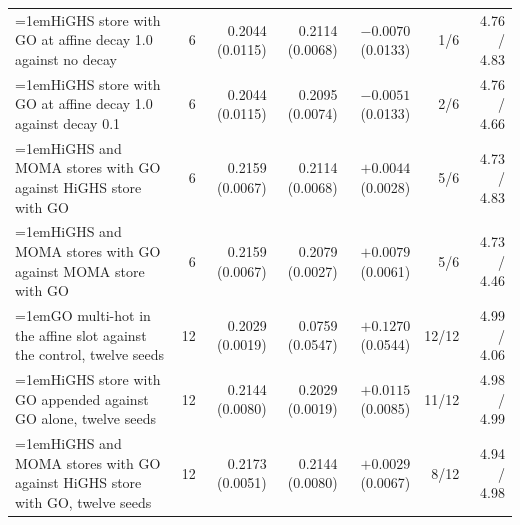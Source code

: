 \begin{table}[H]
\begin{tabular}{@{}>{\raggedright\hangindent=1em\hangafter=1\arraybackslash}p{78.5mm}rrrrrr@{}}
    HiGHS store with GO at affine decay 1.0 against no decay & 6 & 0.2044 (0.0115) & 0.2114 (0.0068) & $-0.0070$ (0.0133) & 1/6 & 4.76 / 4.83 \\
    HiGHS store with GO at affine decay 1.0 against decay 0.1 & 6 & 0.2044 (0.0115) & 0.2095 (0.0074) & $-0.0051$ (0.0133) & 2/6 & 4.76 / 4.66 \\
    HiGHS and MOMA stores with GO against HiGHS store with GO & 6 & 0.2159 (0.0067) & 0.2114 (0.0068) & $+0.0044$ (0.0028) & 5/6 & 4.73 / 4.83 \\
    HiGHS and MOMA stores with GO against MOMA store with GO & 6 & 0.2159 (0.0067) & 0.2079 (0.0027) & $+0.0079$ (0.0061) & 5/6 & 4.73 / 4.46 \\
    GO multi-hot in the affine slot against the control, twelve seeds & 12 & 0.2029 (0.0019) & 0.0759 (0.0547) & $+0.1270$ (0.0544) & 12/12 & 4.99 / 4.06 \\
    HiGHS store with GO appended against GO alone, twelve seeds & 12 & 0.2144 (0.0080) & 0.2029 (0.0019) & $+0.0115$ (0.0085) & 11/12 & 4.98 / 4.99 \\
    HiGHS and MOMA stores with GO against HiGHS store with GO, twelve seeds & 12 & 0.2173 (0.0051) & 0.2144 (0.0080) & $+0.0029$ (0.0067) & 8/12 & 4.94 / 4.98 \\
    \hline
  \end{tabular}
\end{table}

